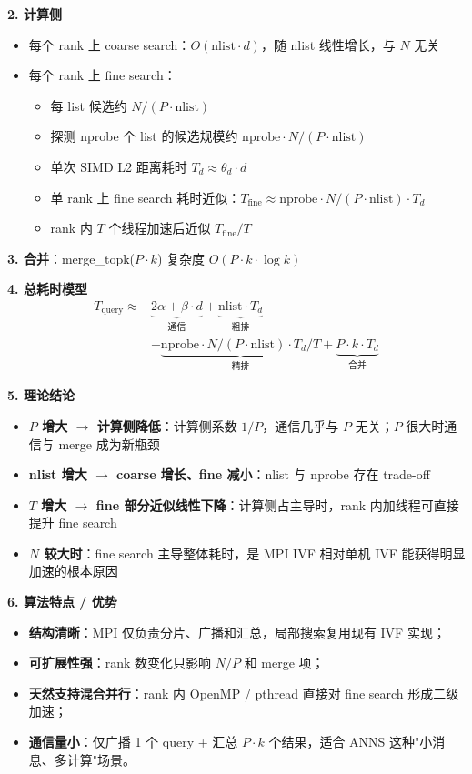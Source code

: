 \documentclass[a4paper]{article}
\begin{document}
\textbf{2. 计算侧}
\begin{itemize}
    \item 每个 rank 上 coarse search：$O(\text{nlist} \cdot d)$，随 nlist 线性增长，与 $N$ 无关
    \item 每个 rank 上 fine search：
    \begin{itemize}
        \item 每 list 候选约 $N / (P \cdot \text{nlist})$
        \item 探测 nprobe 个 list 的候选规模约 $\text{nprobe} \cdot N / (P \cdot \text{nlist})$
        \item 单次 SIMD L2 距离耗时 $T_d \approx \theta_d \cdot d$
        \item 单 rank 上 fine search 耗时近似：$T_{\text{fine}} \approx \text{nprobe} \cdot N/(P \cdot \text{nlist}) \cdot T_d$
        \item rank 内 $T$ 个线程加速后近似 $T_{\text{fine}} / T$
    \end{itemize}
\end{itemize}

\textbf{3. 合并}：merge\_topk($P \cdot k$) 复杂度 $O(P \cdot k \cdot \log k)$

\textbf{4. 总耗时模型}
\begin{align}
T_{\text{query}} \approx & \underbrace{2\alpha + \beta \cdot d}_{\text{通信}} + \underbrace{\text{nlist} \cdot T_d}_{\text{粗排}} \nonumber \\
& + \underbrace{\text{nprobe} \cdot N / (P \cdot \text{nlist}) \cdot T_d / T}_{\text{精排}} + \underbrace{P \cdot k \cdot T_d}_{\text{合并}}
\end{align}

\textbf{5. 理论结论}
\begin{itemize}
    \item \textbf{$P$ 增大 $\rightarrow$ 计算侧降低}：计算侧系数 $1/P$，通信几乎与 $P$ 无关；$P$ 很大时通信与 merge 成为新瓶颈
    \item \textbf{nlist 增大 $\rightarrow$ coarse 增长、fine 减小}：nlist 与 nprobe 存在 trade-off
    \item \textbf{$T$ 增大 $\rightarrow$ fine 部分近似线性下降}：计算侧占主导时，rank 内加线程可直接提升 fine search
    \item \textbf{$N$ 较大时}：fine search 主导整体耗时，是 MPI IVF 相对单机 IVF 能获得明显加速的根本原因
\end{itemize}

\textbf{6. 算法特点 / 优势}
\begin{itemize}
    \item \textbf{结构清晰}：MPI 仅负责分片、广播和汇总，局部搜索复用现有 IVF 实现；
    \item \textbf{可扩展性强}：rank 数变化只影响 $N/P$ 和 merge 项；
    \item \textbf{天然支持混合并行}：rank 内 OpenMP / pthread 直接对 fine search 形成二级加速；
    \item \textbf{通信量小}：仅广播 1 个 query + 汇总 $P \cdot k$ 个结果，适合 ANNS 这种"小消息、多计算"场景。
\end{itemize}
\end{document}
